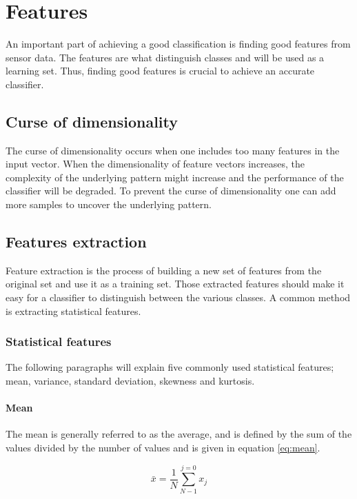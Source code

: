 \documentclass[USenglish]{ifimaster}  %
\begin{document}
\section{Features} \label{features}
An important part of achieving a good classification is finding good features from sensor data. The features are what distinguish classes and will be used as a learning set. Thus, finding good features is crucial to achieve an accurate classifier.
	
\subsection{Curse of dimensionality}\label{curseDim}
The curse of dimensionality occurs when one includes too many features in the input vector. When the dimensionality of feature vectors increases, the complexity of the underlying pattern might increase and the performance of the classifier will be degraded. To prevent the curse of dimensionality one can add more samples to uncover the underlying pattern.
	
\subsection{Features extraction} \label{feature_extraction}
Feature extraction is the process of building a new set of features from the original set and use it as a training set. Those extracted features should make it easy for a classifier to distinguish between the various classes. A common method is extracting statistical features.

\subsubsection{Statistical features} \label{sub:statical}
The following paragraphs will explain five commonly used statistical features; mean, variance, standard deviation, skewness and kurtosis.
	
\paragraph{Mean}
The mean is generally referred to as the average, and is defined by the sum of the values divided by the number of values \cite{Press:2007:NRE:1403886} and is given in equation \ref{eq:mean}.
	
\begin{equation}
\bar{x} = \frac{1}{N}\sum_{N-1}^{j=0}x_{j}
\label{eq:mean}
\end{equation}
	
\end{document}
